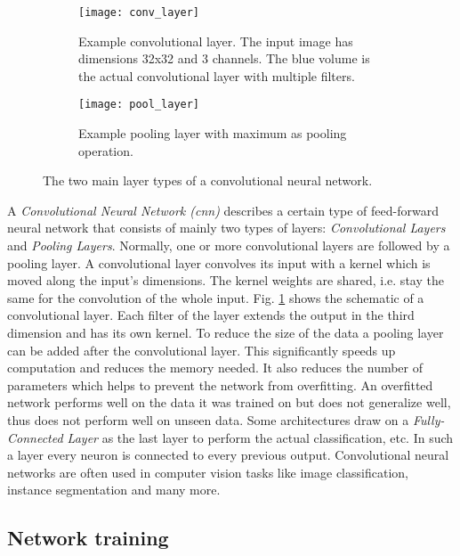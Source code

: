 \begin{figure}[!tbp]
	\centering
	\begin{subfigure}[t]{0.45\textwidth}
		\centering
    	\texttt{[image: conv\_layer]}
    	\caption{Example convolutional layer. The input image has dimensions 32x32 and 3 channels. The blue volume is the actual convolutional layer with multiple filters.}
    	\label{fig:conv_layer}
	\end{subfigure}
	\hfill
	\begin{subfigure}[t]{0.5\textwidth}
		\centering
    	\texttt{[image: pool\_layer]}
    	\caption{Example pooling layer with maximum as pooling operation.}
    	\label{fig:pool_layer}
	\end{subfigure}
	\caption{The two main layer types of a convolutional neural network.}
\end{figure} 

A \textit{Convolutional Neural Network (\gls{cnn})} describes a certain type of feed-forward neural network that consists of mainly two types of layers: \textit{Convolutional Layers} and \textit{Pooling Layers}. Normally, one or more convolutional layers are followed by a pooling layer. A convolutional layer convolves its input with a kernel which is moved along the input's dimensions. The kernel weights are shared, i.e. stay the same for the convolution of the whole input. Fig. \ref{fig:conv_layer} shows the schematic of a convolutional layer. Each filter of the layer extends the output in the third dimension and has its own kernel. To reduce the size of the data a pooling layer can be added after the convolutional layer. This significantly speeds up computation and reduces the memory needed. It also reduces the number of parameters which helps to prevent the network from overfitting. An overfitted network performs well on the data it was trained on but does not generalize well, thus does not perform well on unseen data. Some architectures draw on a \textit{Fully-Connected Layer} as the last layer to perform the actual classification, etc. In such a layer every neuron is connected to every previous output. Convolutional neural networks are often used in computer vision tasks like image classification, instance segmentation and many more.

\subsection{Network training} \label{section:network_training}

